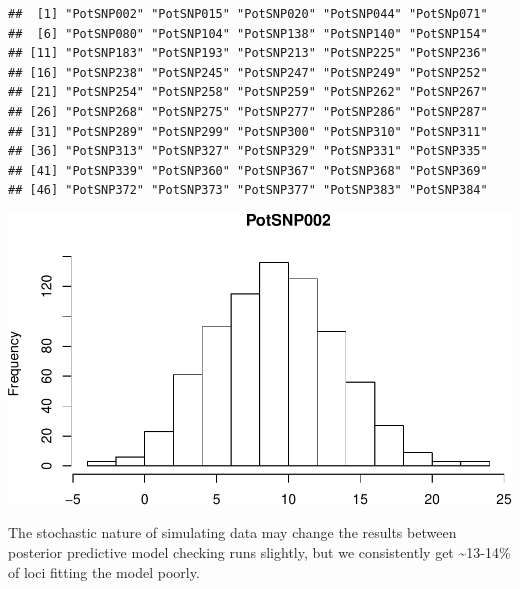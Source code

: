 \documentclass[]{article}
\newenvironment{Shaded}{\begin{snugshade}}{\end{snugshade}}
\newcommand{\KeywordTok}[1]{\textcolor[rgb]{0.13,0.29,0.53}{\textbf{{#1}}}}
\newcommand{\DataTypeTok}[1]{\textcolor[rgb]{0.13,0.29,0.53}{{#1}}}
\newcommand{\DecValTok}[1]{\textcolor[rgb]{0.00,0.00,0.81}{{#1}}}
\newcommand{\StringTok}[1]{\textcolor[rgb]{0.31,0.60,0.02}{{#1}}}
\newcommand{\CommentTok}[1]{\textcolor[rgb]{0.56,0.35,0.01}{\textit{{#1}}}}
\newcommand{\OtherTok}[1]{\textcolor[rgb]{0.56,0.35,0.01}{{#1}}}
\newcommand{\NormalTok}[1]{{#1}}
\begin{document}
\begin{verbatim}
##  [1] "PotSNP002" "PotSNP015" "PotSNP020" "PotSNP044" "PotSNp071"
##  [6] "PotSNP080" "PotSNP104" "PotSNP138" "PotSNP140" "PotSNP154"
## [11] "PotSNP183" "PotSNP193" "PotSNP213" "PotSNP225" "PotSNP236"
## [16] "PotSNP238" "PotSNP245" "PotSNP247" "PotSNP249" "PotSNP252"
## [21] "PotSNP254" "PotSNP258" "PotSNP259" "PotSNP262" "PotSNP267"
## [26] "PotSNP268" "PotSNP275" "PotSNP277" "PotSNP286" "PotSNP287"
## [31] "PotSNP289" "PotSNP299" "PotSNP300" "PotSNP310" "PotSNP311"
## [36] "PotSNP313" "PotSNP327" "PotSNP329" "PotSNP331" "PotSNP335"
## [41] "PotSNP339" "PotSNP360" "PotSNP367" "PotSNP368" "PotSNP369"
## [46] "PotSNP372" "PotSNP373" "PotSNP377" "PotSNP383" "PotSNP384"
\end{verbatim}

\begin{Shaded}
\end{Shaded}

\includegraphics{supplement_files/figure-latex/unnamed-chunk-6-1.pdf}

The stochastic nature of simulating data may change the results between
posterior predictive model checking runs slightly, but we consistently
get \textasciitilde{}13-14\% of loci fitting the model poorly.
\end{document}
